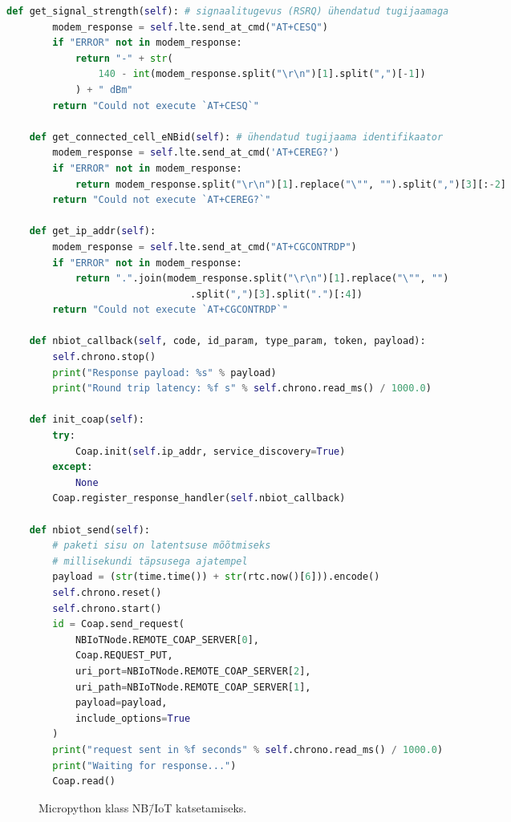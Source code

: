 \documentclass[12pt]{article}
\begin{document}
\begin{spacing}{0.8}
\begin{lstlisting}[language=Python]
    def get_signal_strength(self): # signaalitugevus (RSRQ) ühendatud tugijaamaga
        modem_response = self.lte.send_at_cmd("AT+CESQ")
        if "ERROR" not in modem_response:
            return "-" + str(
                140 - int(modem_response.split("\r\n")[1].split(",")[-1])
            ) + " dBm"
        return "Could not execute `AT+CESQ`"

    def get_connected_cell_eNBid(self): # ühendatud tugijaama identifikaator
        modem_response = self.lte.send_at_cmd('AT+CEREG?')
        if "ERROR" not in modem_response:
            return modem_response.split("\r\n")[1].replace("\"", "").split(",")[3][:-2]
        return "Could not execute `AT+CEREG?`"

    def get_ip_addr(self):
        modem_response = self.lte.send_at_cmd("AT+CGCONTRDP")
        if "ERROR" not in modem_response:
            return ".".join(modem_response.split("\r\n")[1].replace("\"", "")
                                .split(",")[3].split(".")[:4])
        return "Could not execute `AT+CGCONTRDP`"

    def nbiot_callback(self, code, id_param, type_param, token, payload):
        self.chrono.stop()
        print("Response payload: %s" % payload)
        print("Round trip latency: %f s" % self.chrono.read_ms() / 1000.0)

    def init_coap(self):
        try:
            Coap.init(self.ip_addr, service_discovery=True)
        except:
            None
        Coap.register_response_handler(self.nbiot_callback)

    def nbiot_send(self):
        # paketi sisu on latentsuse mõõtmiseks
        # millisekundi täpsusega ajatempel
        payload = (str(time.time()) + str(rtc.now()[6])).encode()
        self.chrono.reset()
        self.chrono.start()
        id = Coap.send_request(
            NBIoTNode.REMOTE_COAP_SERVER[0],
            Coap.REQUEST_PUT,
            uri_port=NBIoTNode.REMOTE_COAP_SERVER[2],
            uri_path=NBIoTNode.REMOTE_COAP_SERVER[1],
            payload=payload,
            include_options=True
        )
        print("request sent in %f seconds" % self.chrono.read_ms() / 1000.0)
        print("Waiting for response...")
        Coap.read()

        \end{lstlisting}
    \end{spacing}
    \begin{figure}[h]
    \caption{Micropython klass NB\=/IoT katsetamiseks.}
    \label{fig:codenbiot}
    \end{figure}
\end{document}
